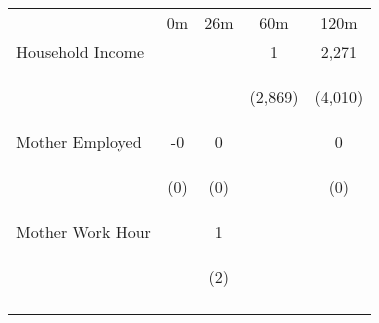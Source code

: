 \begin{tabular}{lcccc}
\hline \noalign{\smallskip} & 0m & 26m & 60m & 120m\\
\noalign{\smallskip}\hline \noalign{\smallskip}Household Income &  &  & 1 & 2,271\\
 & \begin{footnotesize}\end{footnotesize} & \begin{footnotesize}\end{footnotesize} & \begin{footnotesize}(2,869)\end{footnotesize} & \begin{footnotesize}(4,010)\end{footnotesize}\\
\noalign{\smallskip}Mother Employed & -0 & 0 &  & 0\\
 & \begin{footnotesize}(0)\end{footnotesize} & \begin{footnotesize}(0)\end{footnotesize} & \begin{footnotesize}\end{footnotesize} & \begin{footnotesize}(0)\end{footnotesize}\\
\noalign{\smallskip}Mother Work Hour &  & 1 &  & \\
 & \begin{footnotesize}\end{footnotesize} & \begin{footnotesize}(2)\end{footnotesize} & \begin{footnotesize}\end{footnotesize} & \begin{footnotesize}\end{footnotesize}\\
\noalign{\smallskip}\hline\end{tabular}\\

